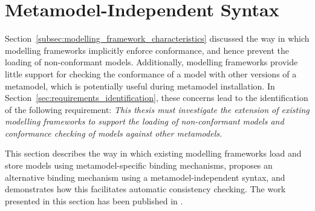 


\section{Metamodel-Independent Syntax}
\label{sec:mmi_syntax}
Section~\ref{subsec:modelling_framework_characteristics} discussed the way in which modelling frameworks implicitly enforce conformance, and hence prevent the loading of non-conformant models. Additionally, modelling frameworks provide little support for checking the conformance of a model with other versions of a metamodel, which is potentially useful during metamodel installation. In Section~\ref{sec:requirements_identification}, these concerns lead to the identification of the following requirement: \emph{This thesis must investigate the extension of existing modelling frameworks to support the loading of non-conformant models and conformance checking of models against other metamodels.}

This section describes the way in which existing modelling frameworks load and store models using metamodel-specific binding mechanisms, proposes an alternative binding mechanism using a metamodel-independent syntax, and demonstrates how this facilitates automatic consistency checking. The work presented in this section has been published in \cite{rose09enhanced}.

